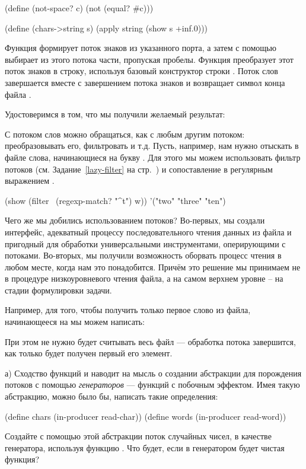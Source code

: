 {\begin{Definition}[emph={p,ch,s,c}]
(define (not-space? c) (not (equal? #\space c)))

(define (chars->string s) 
  (apply string (show s +inf.0)))
\end{Definition}
\noindent
Функция  формирует поток знаков из указанного порта, а затем с помощью  выбирает из этого потока части, пропуская пробелы. Функция  преобразует этот поток знаков в строку, используя базовый конструктор строки . Поток слов завершается вместе с завершением потока знаков и возвращает символ конца файла .

Удостоверимся в том, что мы получили желаемый результат:

С потоком слов можно обращаться, как с любым другим потоком: преобразовывать его, фильтровать и т.д. Пусть, например, нам нужно отыскать в файле слова, начинающиеся на букву . Для этого мы можем использовать фильтр потоков  (см. Задание~\ref{lazy-filter} на стр.~\pageref{lazy-filter}) и сопоставление в регулярным выражением .

\REPL
 {(show (filter~ (regexp-match? "^t") w))}
 {'("two" "three" "ten")}

Чего же мы добились использованием потоков? Во-первых, мы создали интерфейс, адекватный процессу последовательного чтения данных из файла и пригодный для обработки универсальными инструментами, оперирующими с потоками.
Во-вторых, мы получили возможность оборвать процесс чтения в любом месте, когда нам это понадобится. Причём это решение мы принимаем не в процедуре низкоуровневого чтения файла, а на самом верхнем уровне – на стадии формулировки задачи. 

Например, для того, чтобы получить только первое слово из файла, начинающееся на  мы можем написать:

\noindent
При этом не нужно будет считывать весь файл --- обработка потока завершится, как только будет получен первый его элемент.

\begin{Assignment}
а) Сходство функций  и  наводит на мысль о создании абстракции для порождения потоков с помощью \emph{генераторов} --- функций с побочным эффектом. Имея такую абстракцию, можно было бы, написать такие определения:
\begin{SchemeCode}
(define chars (in-producer read-char))
(define words (in-producer read-word))
\end{SchemeCode}
Создайте с помощью этой абстракции поток случайных чисел, в качестве генератора, используя функцию . Что будет, если в генератором будет чистая функция?
\end{Assignment}


}
